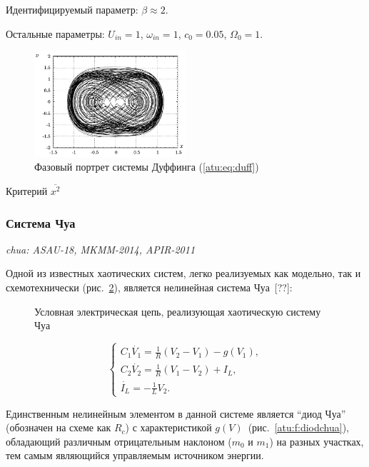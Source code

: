 \documentclass[a4paper,12pt]{article}
\newcommand{\LinkRef}[1]{ \textit{\color{red}#1} }
\begin{document}
Идентифицируемый параметр:
$ \beta \approx 2 $.

Остальные параметры:
\(U_{in}=1\), \(\omega_{in}=1\),
\(c_0 = 0.05\), \( \Omega_0 = 1 \).

\begin{figure}[htb!]
\centerline{\includegraphics[width=0.5\textwidth]{p/cha/duff_phase.pdf} }
\caption{Фазовый портрет системы Дуффинга (\ref{atu:eq:duff})}
\label{atu:f:duff_phase}
\end{figure}

Критерий
$\overline{x^2}$




\FloatBarrier
\subsubsection{Система Чуа} %

\LinkRef{
 chua: ASAU-18, MKMM-2014, APIR-2011
}

Одной из известных хаотических систем, легко реализуемых как модельно,
так и схемотехнически (рис.~\ref{atu:f:chuascheme}),
является нелинейная система Чуа~[??]:

\begin{figure}[htb!]
\begin{center}

\end{center}
\caption{Условная электрическая цепь, реализующая хаотическую систему Чуа}
\label{atu:f:chuascheme}
\end{figure}


\begin{equation}
\begin{cases}
  C_1 \dot{V_1}  = \frac{1}{R} ( V_2 - V_1 ) - g(V_1), \\
  C_2 \dot{V_2}  = \frac{1}{R} ( V_1 - V_2 ) + I_L, \\
  \dot{I_L}      = - \frac{1}{L} V_2 .
\end{cases}
\label{atu:eq:chua}
\end{equation}

Единственным нелинейным элементом в данной системе является ``диод Чуа''
(обозначен на схеме как $R_c$) с
характеристикой $g(V)$~(рис.~\ref{atu:f:diodchua}),
обладающий различным отрицательным наклоном
($m_0$ и $m_1$) на разных участках,
тем самым являющийся управляемым источником энергии.
\end{document}
